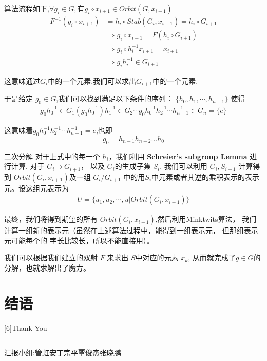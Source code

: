 \documentclass{beamer}
\begin{document}
\begin{frame}
    算法流程如下,$\forall g_i \in  G , \mbox{有} g_i\circ x_{i+1} \in Orbit(G, x_{i+1})$
\begin{align*}
	F^{-1}(g_i\circ x_{i+1}) 
	& = h_i \circ Stab(G_i, x_{i+1}) = h_i\circ G_{i+1}\\
	& \Longrightarrow g_i\circ x_{i+1} = F(h_i\circ G_{i+1}) \\
	& \Longrightarrow g_i \circ h_i^{-1}x_{i+1} = x_{i+1} \\
	& \Longrightarrow g_i h_i^{-1} \in G_{i+1}
\end{align*}

这意味通过$G_i$中的一个元素,我们可以求出$G_{i+1}$中的一个元素.
\end{frame} 

\begin{frame}
    于是给定 $g_0\in G$,我们可以找到满足以下条件的序列：
    $\{h_0, h_1,\cdots,h_{n-1}\}$ 使得
\begin{align}
	g_0h_0^{-1} \in G_1(g_0h_0^{-1}) h_1^{-1} 
	\in G_2\cdots g_0 h_0^{-1}h_2^{-1}\cdots h_{n-1}^{-1}
	\in G_n = \{e\}
\end{align}

这意味着$g_0 h_0^{-1}h_2^{-1}\cdots h_{n-1}^{-1} = e$,也即
\[
	g_0 = h_{n-1}h_{n-2}\ldots h_0
\]
\end{frame} 

\begin{frame}{二次分解}
    对于上式中的每一个 $h_i$，我们利用 {\bf Schreier's subgroup Lemma} 进行计算.
对于 $G_i\supset G_{i+1}$， 以及 $G_i$的生成子集 $S_i$, 我们可以利用
$G_i,S_{i+1}$ 计算得到 $Orbit(G_{i}, x_{i+1})$及一组 $G_i\big/G_{i+1}$
中的用$S_i$中元素或者其逆的乘积表示的表示元。设这组元表示为
\begin{align}
    U = \{u_1,u_2,\cdots, u\big|Orbit(G_i, x_{i+1})\}
\end{align}
\end{frame} 

\begin{frame}
    最终，我们将得到期望的所有 $Orbit(G_i, x_{i+1})$,然后利用Minktwits算法，
我们计算一组新的表示元（虽然在上述算法过程中，能得到一组表示元，
但那组表示元可能每个的 字长比较长，所以不能直接用）。

我们可以根据我们建立的双射 $F$ 来求出 $S$中对应的元素 $x_k$,
从而就完成了$g\in G$的分解，也就求解出了魔方。
\end{frame} 




\newcommand{\scale}[2]{%
    \scalebox{#1}[#1]{#2}}
\section{结语}
\begin{frame}[plain]
    \centering
    \scale{6}{Thank You}

    \vspace*{7em}
    \noindent\rule{.9\linewidth}{2pt}

    汇报小组:管虹安\quad 丁宗平\quad 覃俊杰\quad 张晓鹏
\end{frame} 
\end{document}
